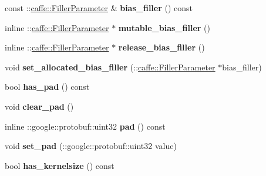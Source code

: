 \begin{DoxyCompactItemize}
const \+::\mbox{\hyperlink{classcaffe_1_1_filler_parameter}{caffe\+::\+Filler\+Parameter}} \& {\bfseries bias\+\_\+filler} () const
\item 
\mbox{\label{classcaffe_1_1_v0_layer_parameter_a13048be8a0371ce9ddeed82e382ccc07}} 
inline \+::\mbox{\hyperlink{classcaffe_1_1_filler_parameter}{caffe\+::\+Filler\+Parameter}} $\ast$ {\bfseries mutable\+\_\+bias\+\_\+filler} ()
\item 
\mbox{\label{classcaffe_1_1_v0_layer_parameter_a6c1c5c551ac749efc523916bb43012e7}} 
inline \+::\mbox{\hyperlink{classcaffe_1_1_filler_parameter}{caffe\+::\+Filler\+Parameter}} $\ast$ {\bfseries release\+\_\+bias\+\_\+filler} ()
\item 
\mbox{\label{classcaffe_1_1_v0_layer_parameter_a8e45c37a495be106bd3a6bcfd3d71f26}} 
void {\bfseries set\+\_\+allocated\+\_\+bias\+\_\+filler} (\+::\mbox{\hyperlink{classcaffe_1_1_filler_parameter}{caffe\+::\+Filler\+Parameter}} $\ast$bias\+\_\+filler)
\item 
\mbox{\label{classcaffe_1_1_v0_layer_parameter_a9843700ea6997b82128f9e1e2dcf522c}} 
bool {\bfseries has\+\_\+pad} () const
\item 
\mbox{\label{classcaffe_1_1_v0_layer_parameter_a6b7b9060a425465167dbf28154b17b0c}} 
void {\bfseries clear\+\_\+pad} ()
\item 
\mbox{\label{classcaffe_1_1_v0_layer_parameter_a641db03651b5353d86fa007baec742b0}} 
inline \+::google\+::protobuf\+::uint32 {\bfseries pad} () const
\item 
\mbox{\label{classcaffe_1_1_v0_layer_parameter_adc7cd6b531424e8c991956ea366f68da}} 
void {\bfseries set\+\_\+pad} (\+::google\+::protobuf\+::uint32 value)
\item 
\mbox{\label{classcaffe_1_1_v0_layer_parameter_a1f7746aeda4d702f2626d264dec8927b}} 
bool {\bfseries has\+\_\+kernelsize} () const
\item 
\mbox{\label{classcaffe_1_1_v0_layer_parameter_a32f3d73b0a5808d760c980c75f487b41}} 

\end{DoxyCompactItemize}
